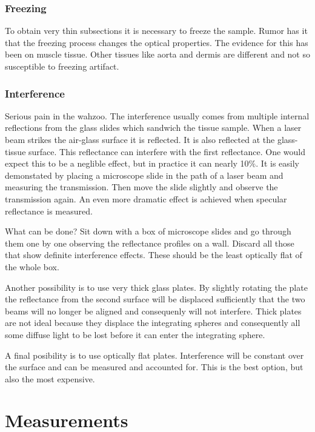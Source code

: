 \documentclass{article}
\begin{document}
\subsubsection{Freezing}  
To obtain very thin subsections it is necessary to freeze the sample.  Rumor
has it that the freezing process changes the optical properties.  The
evidence for this has been on muscle tissue.  Other tissues like aorta and
dermis are different and not so susceptible to freezing artifact.

\subsubsection{Interference}  
Serious pain in the wahzoo.  The interference usually comes from multiple
internal reflections from the glass
slides which sandwich the tissue sample.  When a laser beam strikes the
air-glass surface it is reflected.  It is also reflected at the
glass-tissue surface.  This reflectance can interfere with the first
reflectance. One would expect this to be a neglible effect, but in practice
it can nearly 10\%.  It is easily demonstated by placing a microscope
slide in the path of a laser beam and measuring the transmission.  Then
move the slide slightly and observe the transmission again.  An even more
dramatic effect is achieved when specular reflectance is measured.

What can be done?  Sit down with a box of microscope slides and go through
them one by one observing the reflectance profiles on a wall.  Discard all
those that show definite interference effects.  These should be the least
optically flat of the whole box.

Another possibility is to use very thick glass plates.  By slightly
rotating the plate the reflectance from the second surface will be
displaced sufficiently that the two beams will no longer be aligned and
consequenly will not interfere. Thick plates are not ideal because they
displace the integrating spheres and consequently all some diffuse light to
be lost before it can enter the integrating sphere.

A final posibility is to use optically flat plates.  Interference will be
constant over the surface and can be measured and accounted for.  This is
the best option, but also the most expensive.

\clearpage
\section{Measurements}
\end{document}
